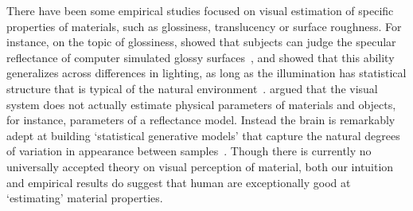 There have been some empirical studies focused on visual estimation of specific properties of materials, such as glossiness, translucency or surface roughness. For instance, on the topic of glossiness, \citeauthor{nishida1998use} showed that subjects can judge the specular reflectance of computer simulated glossy surfaces~\cite{nishida1998use}, and \citeauthor{fleming2003real} showed that this ability generalizes across differences in lighting, as long as the illumination has statistical structure that is typical of the natural environment~\cite{fleming2003real}. \citeauthor{fleming2014visual} argued that the visual system does not actually estimate physical parameters of materials and objects, for instance, parameters of a reflectance model. Instead the brain is remarkably adept at building `statistical generative models' that capture the natural degrees of variation in appearance between samples~\cite{fleming2014visual}. Though there is currently no universally accepted theory on visual perception of material, both our intuition and empirical results do suggest that human are exceptionally good at `estimating' material properties.

